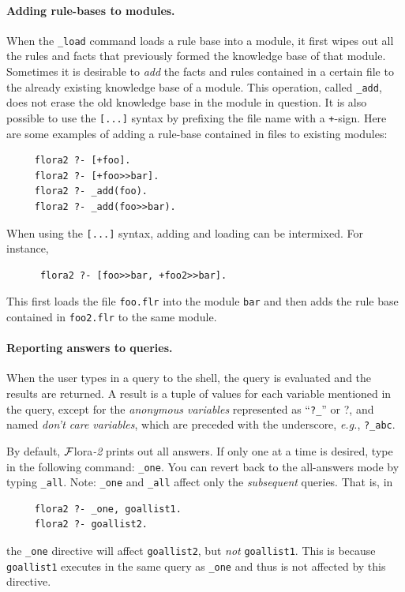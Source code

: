 \documentclass[11pt]{article}
\newcommand{\anon}{?}
\newcommand{\FLORA}{{\mbox{\sc ${\cal F}${lora}\rm\emph{-2}}}\xspace}
\begin{document}
\paragraph{Adding rule-bases to modules.}
When the {\tt \_load} command loads a rule base into a module, it first wipes
out all the rules and facts that previously formed the knowledge base of
that module. Sometimes it is desirable to \emph{add} the facts and
rules contained in a certain file to the already existing knowledge base of
a module. This operation, called {\tt \_add}, does not erase the old
knowledge base in the module in question.  It is also possible to use the
{\tt [...]} syntax by prefixing the file name with a {\tt +}-sign. Here are
some examples of adding a rule-base contained in files to existing
modules:
\index{\tt [file]}
\begin{verbatim}
     flora2 ?- [+foo].
     flora2 ?- [+foo>>bar].
     flora2 ?- _add(foo).
     flora2 ?- _add(foo>>bar).
\end{verbatim}
When using the {\tt [...]} syntax, adding and loading can be
intermixed. For instance, 
\begin{verbatim}
      flora2 ?- [foo>>bar, +foo2>>bar].
\end{verbatim}
This first loads the file {\tt foo.flr} into the module {\tt bar} and then
adds the rule base contained in {\tt foo2.flr} to the same module.


\paragraph{Reporting answers to queries.}
When the user types in a query to the shell, the query is evaluated and the
results are returned. A result is a tuple of values for each variable
mentioned in the query, except for the \emph{anonymous variables}
represented as ``{\tt ?\_}'' or \anon, and named {\em don't care
variables}, which are
preceded with the underscore, {\it e.g.}, {\tt ?\_abc}.

By default, \FLORA prints out all answers. If only one at a time is
desired, type in the following command: {\tt \_one}. You can revert back to
the all-answers mode by typing {\tt \_all}. Note: {\tt \_one} and {\tt \_all}
affect only the \emph{subsequent} queries. That is, in
\begin{verbatim}
     flora2 ?- _one, goallist1.
     flora2 ?- goallist2.
\end{verbatim}
the {\tt \_one} directive will affect {\tt goallist2},
but \emph{not} {\tt goallist1}. This is because {\tt goallist1} executes in
the same query as {\tt \_one} and thus is not affected by this directive.
\end{document}
